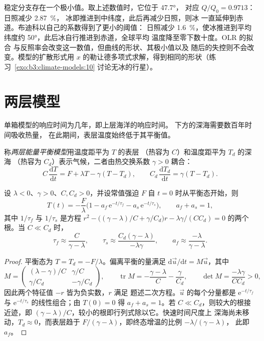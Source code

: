 稳定分支存在一个极小值。取上述数值时，它位于 \ang{47.7}，
对应 $Q/Q_0 = \num{0.9713}$：日照减少 \qty{2.87}{\percent}，
冰即推进到中纬度，此后再减少日照，则冰
一直延伸到赤道。布迪科以自己的系数得到了更小的阈值：
日照减少 \qty{1.6}{\percent}，使冰推进到平均纬度约
\ang{50}，此后冰自行推进到赤道，全球平均
温度降至零下数十度。OLR 的拟合
与反照率会改变这一数值，但曲线的形状、其极小值以及
随后的失控则不会改变。模型的扩散形式用
$x$ 的勒让德多项式求解，得到相同的形状（练习~\ref{exo:b3:climate-models:10}
讨论无冰的行星）。

\section{两层模型}\label{sec:b3:climate-models:two-layer}

单箱模型的响应时间为几年，即上层海洋的响应时间。
下方的深海需要数百年时间吸收热量，
在此期间，表层温度始终低于其平衡值。

\begin{definition}[两层能量平衡模型]\label{def:b3:climate-models:two-layer}
称\emph{两层能量平衡模型}用温度距平为 $T$ 的表层
（热容为 $C$）和温度距平为 $T_d$ 的深海
（热容为 $C_d$）表示气候，二者由热交换系数
$\gamma > 0$ 耦合：
\[
C\,\frac{\mathrm dT}{\mathrm dt} = F + \lambda T - \gamma(T - T_d), \qquad
C_d\,\frac{\mathrm dT_d}{\mathrm dt} = \gamma(T - T_d) .
\]
\end{definition}

\begin{theorem}[快速响应与慢速响应]\label{thm:b3:climate-models:two-layer}
设 $\lambda < 0$、$\gamma > 0$、$C, C_d > 0$，并设常值强迫
$F$ 自 $t = 0$ 时从平衡态开始，则
\[
T(t) = -\frac{F}{\lambda}\Big(1 - a_f\,\mathrm e^{-t/\tau_f} - a_s\,\mathrm
e^{-t/\tau_s}\Big), \qquad a_f + a_s = 1 ,
\]
其中 $1/\tau_f$ 与 $1/\tau_s$ 是方程 $r^2 - \big((\gamma -
\lambda)/C + \gamma/C_d\big)r - \lambda\gamma/(CC_d) = 0$ 的两个根。当 $C \ll C_d$ 时，
\[
\tau_f \approx \frac{C}{\gamma - \lambda}, \qquad
\tau_s \approx \frac{C_d(\gamma - \lambda)}{-\lambda\gamma}, \qquad
a_f \approx \frac{-\lambda}{\gamma - \lambda} .
\]
\end{theorem}

\begin{proof}
平衡态为 $T = T_d = -F/\lambda$。偏离平衡的量满足
$\mathrm d\vec u/\mathrm dt = M\vec u$，其中
\[
M = \begin{pmatrix} (\lambda - \gamma)/C & \gamma/C\\ \gamma/C_d &
-\gamma/C_d\end{pmatrix}, \qquad
\operatorname{tr}M = -\frac{\gamma - \lambda}{C} - \frac{\gamma}{C_d},
\qquad \det M = \frac{-\lambda\gamma}{CC_d} > 0 ,
\]
因此两个特征值 $-r$ 皆为负实数，$r$ 满足
题述二次方程。$\vec u$ 的每个分量都是 $\mathrm
e^{-t/\tau_f}$ 与 $\mathrm e^{-t/\tau_s}$ 的线性组合；由 $T(0) = 0$ 得 $a_f + a_s =
1$。若 $C \ll C_d$，则较大的根接近迹，即 $(\gamma -
\lambda)/C$，较小的根即行列式除以它。快速时间尺度上
深海尚未移动，$T_d \approx 0$，而表层趋于
$F/(\gamma - \lambda)$，即终态增温的比例 $-\lambda/(\gamma - \lambda)$，
此即 $a_f$。
\end{proof}

